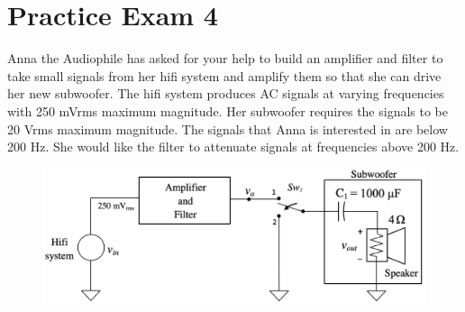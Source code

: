 \chapter{Practice Exam 4}
    Anna the Audiophile has asked for your help to build an amplifier and filter to take small
    signals from her hifi system and amplify them so that she can drive her new subwoofer. The
    hifi system produces AC signals at varying frequencies with 250 mVrms maximum magnitude.
    Her subwoofer requires the signals to be 20 Vrms maximum magnitude. The signals that Anna
    is interested in are below 200 Hz. She would like the filter to attenuate signals at frequencies
    above 200 Hz.
    \begin{figure}[H]
        \centering
        \includegraphics[width=0.6\linewidth]{figures/exams/audiophile.png}
    \end{figure}
